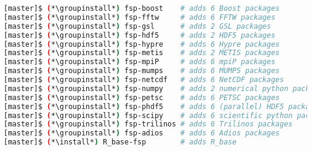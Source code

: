 \begin{lstlisting}[language=bash,keywords={},upquote=true,keepspaces]
[master]$ (*\groupinstall*) fsp-boost    # adds 6 Boost packages
[master]$ (*\groupinstall*) fsp-fftw     # adds 6 FFTW packages
[master]$ (*\groupinstall*) fsp-gsl      # adds 2 GSL packages
[master]$ (*\groupinstall*) fsp-hdf5     # adds 2 HDF5 packages
[master]$ (*\groupinstall*) fsp-hypre    # adds 6 Hypre packages
[master]$ (*\groupinstall*) fsp-metis    # adds 2 METIS packages
[master]$ (*\groupinstall*) fsp-mpiP     # adds 6 mpiP packages
[master]$ (*\groupinstall*) fsp-mumps    # adds 6 MUMPS packages
[master]$ (*\groupinstall*) fsp-netcdf   # adds 6 NetCDF packages
[master]$ (*\groupinstall*) fsp-numpy    # adds 2 numerical python packages
[master]$ (*\groupinstall*) fsp-petsc    # adds 6 PETSC packages
[master]$ (*\groupinstall*) fsp-phdf5    # adds 6 (parallel) HDF5 packages
[master]$ (*\groupinstall*) fsp-scipy    # adds 6 scientific python packages
[master]$ (*\groupinstall*) fsp-trilinos # adds 6 Trilinos packages
[master]$ (*\groupinstall*) fsp-adios    # adds 6 Adios packages
[master]$ (*\install*) R_base-fsp        # adds R_base 
\end{lstlisting}
